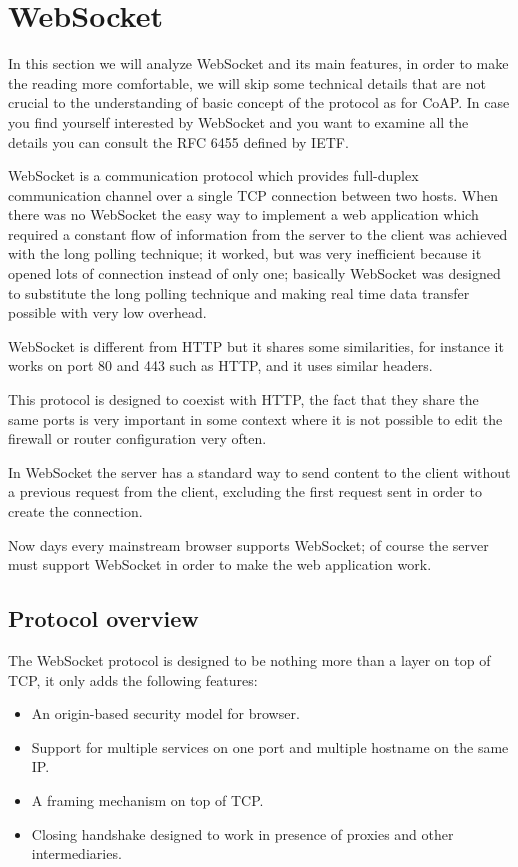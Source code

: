 \section{WebSocket}
In this section we will analyze WebSocket and its main features, in order to make the reading more comfortable,
we will skip some technical details that are not crucial to the understanding of basic concept of the protocol as for CoAP.\newline
In case you find yourself interested by WebSocket and you want to examine all the details you can consult
the RFC 6455 defined by IETF. \newline

WebSocket is a communication protocol which provides full-duplex communication channel over a single TCP connection between two hosts.\newline
When there was no WebSocket the easy way to implement a web application which required a constant flow of information from the server to the client was achieved with the long polling technique; it worked, but was very inefficient because it opened lots of connection instead of only one; basically WebSocket was designed to substitute the long polling technique and making real time data transfer possible with very low overhead.\newline

WebSocket is different from HTTP but it shares some similarities, for instance it works on port 80 and 443 such as HTTP, and it uses similar headers.\newline

This protocol is designed to coexist with HTTP, the fact that they share the same ports is very important in some context where it is not possible to edit the firewall or router configuration very often.\newline

In WebSocket the server has a standard way to send content to the client without a previous request from the client, excluding the first request sent in order to create the connection.\newline

Now days every mainstream browser supports WebSocket; of course the server must support WebSocket in order to make the web application work.\newline

\subsection{Protocol overview}
The WebSocket protocol is designed to be nothing more than a layer on top of TCP, it only adds the following features:
\begin{itemize}
	\item An origin-based security model for browser.
	\item Support for multiple services on one port and multiple hostname on the same IP.
	\item A framing mechanism on top of TCP.
	\item Closing handshake designed to work in presence of proxies and other intermediaries.
\end{itemize}

